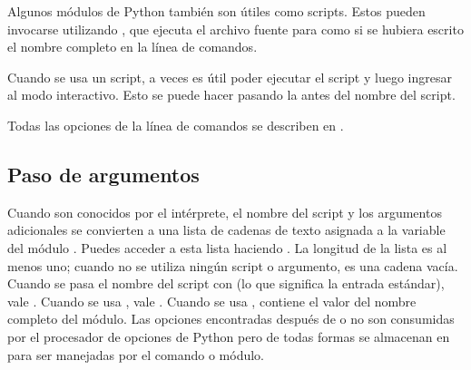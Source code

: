 \documentclass[a4,10pt,spanish]{sphinxmanual}
\begin{document}
\sphinxAtStartPar
Algunos módulos de Python también son útiles como scripts. Estos pueden invocarse utilizando , que ejecuta el archivo fuente para  como si se hubiera escrito el nombre completo en la línea de comandos.

\sphinxAtStartPar
Cuando se usa un script, a veces es útil poder ejecutar el script y luego ingresar al modo interactivo. Esto se puede hacer pasando la  antes del nombre del script.

\sphinxAtStartPar
Todas las opciones de la línea de comandos se describen en .


\subsection{Paso de argumentos}
\label{\detokenize{tutorial/interpreter:argument-passing}}\label{\detokenize{tutorial/interpreter:tut-argpassing}}
\sphinxAtStartPar
Cuando son conocidos por el intérprete, el nombre del script y los argumentos adicionales se convierten a una lista de cadenas de texto asignada a la variable  del módulo . Puedes acceder a esta lista haciendo . La longitud de la lista es al menos uno; cuando no se utiliza ningún script o argumento,  es una cadena vacía. Cuando se pasa el nombre del script con  (lo que significa la entrada estándar),  vale . Cuando se usa  ,  vale . Cuando se usa  ,  contiene el valor del nombre completo del módulo. Las opciones encontradas después de   o   no son consumidas por el procesador de opciones de Python pero de todas formas se almacenan en  para ser manejadas por el comando o módulo.
\end{document}
